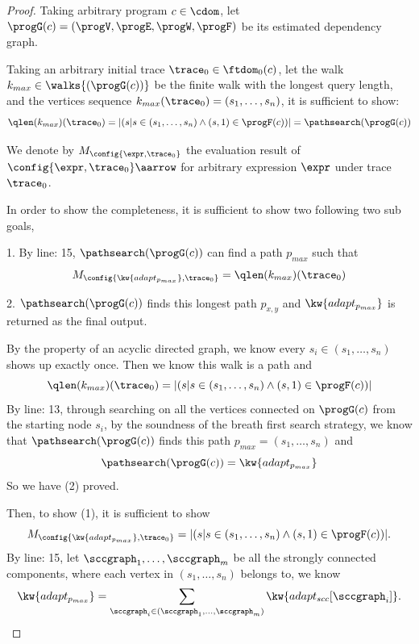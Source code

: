 \begin{proof}
  Taking arbitrary program $c \in \cdom$, let $\progG(c) = (\progV, \progE, \progW, \progF)$ be its 
  estimated dependency graph.

  Taking an arbitrary initial trace $ \trace_0 \in \ftdom_0(c)$,
  let the walk $k_{max} \in \walks{(\progG(c))}$ be the finite walk with the longest query length, and the vertices sequence
  $k_{max}(\trace_0) = (s_1, \ldots, s_n)$, 
  it is sufficient to show:
  \[
    \qlen(k_{max})(\trace_0) = |(s | s \in (s_1, \ldots, s_n) \land (s, 1) \in \progF(c))| = \pathsearch(\progG(c))
  \]

  We denote by $M_{\config{\expr, \trace_0}}$ the evaluation result of $\config{\expr, \trace_0} \aarrow$ 
  for arbitrary expression $\expr$ under trace $\trace_0$.

  In order to show the completeness, it is sufficient to show two following two sub goals,

  1. By line: 15, $\pathsearch(\progG(c))$ can find a path $p_{max}$ such that 
  $$
  M_{\config{\kw{adapt_{p_{max}}}, \trace_0}} = \qlen(k_{max})(\trace_0)
  $$ 

  2. $\pathsearch(\progG(c))$ finds this longest path $p_{x,y}$ 
  and $\kw{adapt_{p_{max}}}$ is returned as the final output.

  By the property of an acyclic directed graph, we know
  every $s_i \in (s_1, \ldots, s_n)$ shows up exactly once. 
  Then we know this walk is a path and
  \[
    \qlen(k_{max})(\trace_0)  = |(s | s \in (s_1, \ldots, s_n) \land (s, 1) \in \progF(c))|
  \]
  By line: 13, through searching on all the vertices connected on $\progG(c)$ from the starting node $s_i$,
  by the soundness of the breath first search strategy,
  we know that
  $\pathsearch(\progG(c))$ finds this path $p_{max} = (s_1, \ldots, s_n)$ and 
  \[
    \pathsearch(\progG(c)) = \kw{adapt_{p_{max}}}
  \]
  So we have (2) proved.
  
  Then, to show (1), it is sufficient to show 
  $$
  M_{\config{\kw{adapt_{p_{max}}}, \trace_0}} =  |(s | s \in (s_1, \ldots, s_n) \land (s, 1) \in \progF(c))|.
  $$
  By line: 15, let $\sccgraph_1, \ldots, \sccgraph_m$ be all the strongly connected components, where each vertex in 
  $(s_1, \ldots, s_n) $ belongs to, we know
  \[
    \kw{adapt_{p_{max}}} = \sum_{\sccgraph_i \in (\sccgraph_1, \ldots, \sccgraph_m)} \kw{adapt_{scc}[\sccgraph_i]}. 
    \]


\end{proof}
